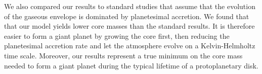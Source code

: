 \documentclass[apj]{emulateapj}
\begin{document}
 We also compared our results to standard studies that assume that the evolution of the gaseous envelope is dominated by planetesimal accretion. We found that that our model yields lower core masses than the standard results. It is therefore easier to form a giant planet by growing the core first, then reducing the planetesimal accretion rate and let the atmosphere evolve on a Kelvin-Helmholtz time scale. Moreover, our results represent a true minimum on the core mass needed to form a giant planet during the typical lifetime of a protoplanetary disk.
 
% 
 
 


\end{document}
